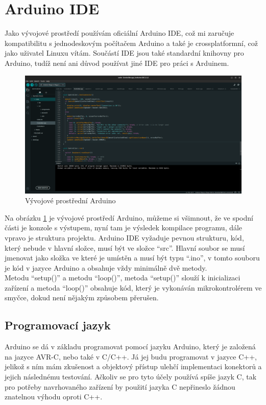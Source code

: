 
\section{Arduino IDE}
Jako vývojové prostředí používám oficiální Arduino IDE, což mi zaručuje kompatibilitu s jednodeskovým počítačem Arduino a také je crossplatformní, což jako uživatel Linuxu vítám. Součástí IDE jsou také standardní knihovny pro Arduino, tudíž není ani důvod používat jiné IDE pro práci s Arduinem.

\begin{figure}[h]
	\centering
	\includegraphics[width=\textwidth]{pictures/arduinoIDE.png}
    	\caption{Vývojové prostřední Arduino}
   	\label{fig:arduinoIDE}
\end{figure}
\newpage
Na obrázku \ref{fig:arduinoIDE} je vývojové prostředí Arduino, můžeme si všimnout, že ve spodní části je konzole s výstupem, nyní tam je výsledek kompilace programu, dále vpravo je struktura projektu. Arduino IDE vyžaduje pevnou strukturu, kód, který nebude v hlavní složce, musí být ve složce “src”. Hlavní soubor se musí jmenovat jako složka ve které je umístěn a musí být typu “.ino”, v tomto souboru je kód v jazyce Arduino a obsahuje vždy minimálně dvě metody.\\
Metodu “setup()” a metodu “loop()”, metoda “setup()” slouží k inicializaci zařízení a metoda “loop()” obsahuje kód, který je vykonáván mikrokontrolérem ve smyčce, dokud není nějakým způsobem přerušen.

\subsection{Programovací jazyk}
Arduino se dá v základu programovat pomocí jazyku Arduino, který je založená na jazyce AVR-C, nebo také v C/C++. Já jej budu programovat v jazyce C++, jelikož s ním mám zkušenost a objektový přístup ulehčí implementaci konektorů a jejich následnému testování. Ačkoliv se pro tyto účely používá spíše jazyk C, tak pro potřeby navrhovaného zařízení by použití jazyka C nepřineslo žádnou znatelnou výhodu oproti C++.